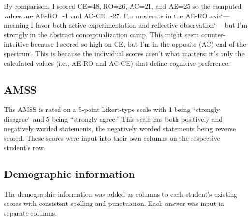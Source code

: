 By comparison, I scored CE=48, RO=26, AC=21, and AE=25 so the computed values are AE-RO=-1 and AC-CE=-27. I'm moderate in the AE-RO axis`--- meaning I favor both active experimentation and reflective observation`--- but I'm strongly in the abstract conceptualization camp. This might seem counter-intuitive because I scored so high on CE, but I'm in the opposite (AC) end of the spectrum. This is because the individual scores aren't what matters: it's only the calculated values (i.e., AE-RO and AC-CE) that define cognitive preference.

\subsection{AMSS}
The AMSS is rated on a 5-point Likert-type scale with 1 being ``strongly disagree'' and 5 being ``strongly agree.'' This scale has both positively and negatively worded statements, the negatively worded statements being reverse scored. These scores were input into their own columns on the respective student's row.

\subsection{Demographic information}
The demographic information was added as columns to each student's existing scores with consistent spelling and punctuation. Each answer was input in separate columns.
